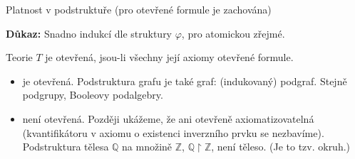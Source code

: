 \documentclass{beamer}
\begin{document}
\begin{frame}{Platnost v podstruktuře (pro otevřené formule je zachována)}
    
    \pause

    \pause
    \textbf{Důkaz:}
    Snadno indukcí dle struktury $\varphi$, pro atomickou zřejmé.\hfill\qedsymbol
    
    \medskip

    \pause

    \medskip

    \pause
    Teorie $T$ je \alert{otevřená}, jsou-li všechny její axiomy otevřené formule.

    \pause

    \medskip

    \pause
    \begin{itemize}
        \item {} je otevřená. Podstruktura grafu je také graf: (indukovaný) \alert{podgraf}. Stejně podgrupy, Booleovy podalgebry.\pause
        \item {} není otevřená. \pause Později ukážeme, že ani \alert{otevřeně axiomatizovatelná} (kvantifikátoru v axiomu o existenci inverzního prvku se nezbavíme). \pause Podstruktura tělesa $\mathbb Q$ na množině $\mathbb Z$, $\mathbb Q\restriction\mathbb Z$, není těleso. (Je to tzv. \alert{okruh}.)
    \end{itemize}
    
\end{frame}
\end{document}
